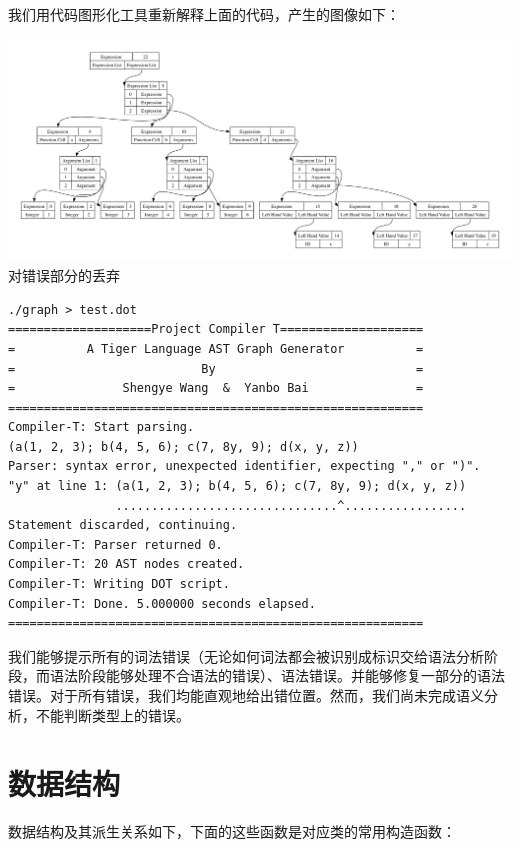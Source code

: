 我们用代码图形化工具重新解释上面的代码，产生的图像如下：

\begin{center}
\includegraphics[width=\columnwidth]{test}  \\
对错误部分的丢弃
\end{center}

\begin{verbatim}
./graph > test.dot
====================Project Compiler T====================
=          A Tiger Language AST Graph Generator          =
=                          By                            =
=               Shengye Wang  &  Yanbo Bai               =
==========================================================
Compiler-T: Start parsing.
(a(1, 2, 3); b(4, 5, 6); c(7, 8y, 9); d(x, y, z))
Parser: syntax error, unexpected identifier, expecting "," or ")".
"y" at line 1: (a(1, 2, 3); b(4, 5, 6); c(7, 8y, 9); d(x, y, z))
               ...............................^.................
Statement discarded, continuing.
Compiler-T: Parser returned 0.
Compiler-T: 20 AST nodes created.
Compiler-T: Writing DOT script.
Compiler-T: Done. 5.000000 seconds elapsed.
==========================================================
\end{verbatim}

我们能够提示所有的词法错误（无论如何词法都会被识别成标识交给语法分析阶段，而语法阶段能够处理不合语法的错误）、语法错误。并能够修复一部分的语法错误。对于所有错误，我们均能直观地给出错位置。然而，我们尚未完成语义分析，不能判断类型上的错误。

\newpage

\section{数据结构}

数据结构及其派生关系如下，下面的这些函数是对应类的常用构造函数：


